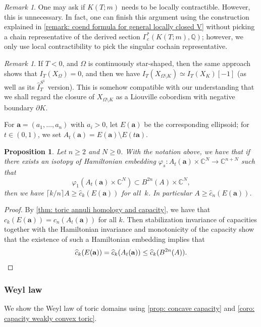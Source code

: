\documentclass[11pt]{amsart}
\numberwithin{equation}{section}
\theoremstyle{plain}
\newtheorem{Prop}[prop]{Proposition}
\theoremstyle{definition}
\theoremstyle{remark}
\newtheorem{RMK}[rmk]{Remark}
\newcommand{\bC} { {\mathbb{C}}}
\newcommand{\bQ} { {\mathbb{Q}}}
\begin{document}
\begin{RMK}One may ask if $K(T;m)$ needs to be locally contractible. However, this is unnecessary. In fact, one can finish this argument using the construction explained in \autoref{remark: coend formula for general locally closed V} without picking a chain representative of the derived section $\Gamma^*_c(K(T;m),\bQ)$; however, we only use local contractibility to pick the singular cochain representative.
\end{RMK}
\begin{RMK}If $T<0$, and $\Omega$ is continuously star-shaped, then the same approach shows that $I_T(X_\Omega)=0$, and then we have $I_T(X_{\Omega\setminus K})\simeq I_T(X_K)[-1]$ (as well as its $\widehat I_T^{S^1}$ version). This is somehow compatible with our understanding that we shall regard the closure of $X_{\Omega\setminus K}$ as a Liouville cobordism with negative boundary $\partial K$.
\end{RMK}

For $\mathbf{a} = (a_1, \dots, a_n)$ with $a_i>0$, let $E(\mathbf{a})$ be the corresponding ellipsoid; for $t\in (0,1)$, we set $A_t(\mathbf{a}) = E(\mathbf{a}) \setminus E(t\mathbf{a})$. 

\begin{Prop}\label{prop: ellipsoid stabilization}Let $n\geq 2$ and $N\geq 0 $. With the notation above, we have that if there exists an isotopy of Hamiltonian embedding $\varphi_s:A_t(\mathbf{a})\times \bC^N \to \bC^{n+N}$ such that
\[\varphi_1(A_t(\mathbf{a})\times \bC^N)\subset B^{2n}(A)\times \bC^N,\]
then we have $\lceil k/n \rceil A\geq \widehat{c}_k(E(\mathbf{a}))$ for all $\ k$.
In particular $A\geq \widehat{c}_n(E(\mathbf{a}))$.
\end{Prop}
\begin{proof}By \autoref{thm: toric annuli homology and capacity}, we have that $c_k(E(\mathbf{a}))=c_n(A_t(\mathbf{a}))$ for all $k$. Then stabilization invariance of capacities together with the Hamiltonian invariance and monotonicity of the capacity show  that the existence of such a Hamiltonian embedding implies that 
\[\widehat{c}_k(E(\mathbf{a}))=\widehat{c}_k(A_t(\mathbf{a}))\leq \widehat{c}_k(B^{2n}(A)).\qedhere\]
\end{proof}


\subsubsection{Weyl law}
We show the Weyl law of toric domains using \autoref{prop: concave capacity} and \autoref{coro: capacity weakly convex toric}.
\end{document}
